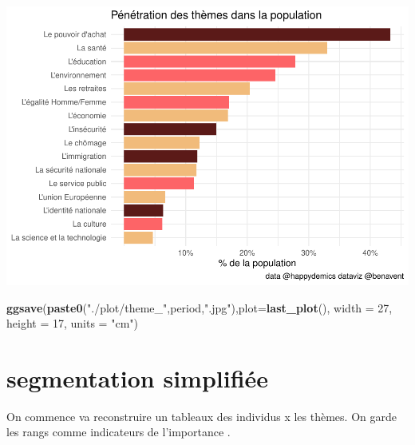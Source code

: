 \documentclass[
]{book}
\newenvironment{Shaded}{\begin{snugshade}}{\end{snugshade}}
\newcommand{\DataTypeTok}[1]{\textcolor[rgb]{0.13,0.29,0.53}{#1}}
\newcommand{\DecValTok}[1]{\textcolor[rgb]{0.00,0.00,0.81}{#1}}
\newcommand{\KeywordTok}[1]{\textcolor[rgb]{0.13,0.29,0.53}{\textbf{#1}}}
\newcommand{\NormalTok}[1]{#1}
\newcommand{\OperatorTok}[1]{\textcolor[rgb]{0.81,0.36,0.00}{\textbf{#1}}}
\newcommand{\StringTok}[1]{\textcolor[rgb]{0.31,0.60,0.02}{#1}}
\begin{document}
\includegraphics{bookdown-demo_files/figure-latex/0812-1.pdf}

\begin{Shaded}
\begin{Highlighting}[]
\KeywordTok{ggsave}\NormalTok{(}\KeywordTok{paste0}\NormalTok{(}\StringTok{"./plot/theme_"}\NormalTok{,period,}\StringTok{".jpg"}\NormalTok{),}\DataTypeTok{plot=}\KeywordTok{last_plot}\NormalTok{(), }\DataTypeTok{width =} \DecValTok{27}\NormalTok{, }\DataTypeTok{height =} \DecValTok{17}\NormalTok{, }\DataTypeTok{units =} \StringTok{"cm"}\NormalTok{)}
\end{Highlighting}
\end{Shaded}

\hypertarget{segmentation-simplifiuxe9e}{%
\section{segmentation simplifiée}\label{segmentation-simplifiuxe9e}}

On commence va reconstruire un tableaux des individus x les thèmes. On garde les rangs comme indicateurs de l'importance .

\begin{Shaded}
\end{Shaded}
\end{document}

